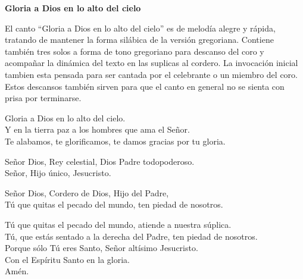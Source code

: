 \documentclass[12pt, letterpaper]{report}
\begin{document}
    {%
\parindent 0pt
\noindent
\ifx\preLilyPondExample \undefined
\else
  \expandafter\preLilyPondExample
\fi
\def\lilypondbook{}%
%
\ifx\postLilyPondExample \undefined
\else
  \expandafter\postLilyPondExample
\fi
}
    \clearpage

    {%
\parindent 0pt
\noindent
\ifx\preLilyPondExample \undefined
\else
  \expandafter\preLilyPondExample
\fi
\def\lilypondbook{}%
%
\ifx\postLilyPondExample \undefined
\else
  \expandafter\postLilyPondExample
\fi
}
    \clearpage

    {%
\parindent 0pt
\noindent
\ifx\preLilyPondExample \undefined
\else
  \expandafter\preLilyPondExample
\fi
\def\lilypondbook{}%
%
\ifx\postLilyPondExample \undefined
\else
  \expandafter\postLilyPondExample
\fi
}
    \clearpage

    \begin{center}
      \LARGE \textbf{Gloria a Dios en lo alto del cielo}
    \end{center}

    \Large El canto ``Gloria a Dios en lo alto del cielo'' es de melod\'ia alegre y r\'apida, tratando de mantener la forma sil\'abica de la versi\'on gregoriana. Contiene tambi\'en tres solos a forma de tono gregoriano para descanso del coro y acompa\~nar la din\'amica del texto en las suplicas al cordero. La invocaci\'on inicial tambien esta pensada para ser cantada por el celebrante o un miembro del coro.  Estos descansos tambi\'en sirven para que el canto en general no se sienta con prisa por terminarse.

    \noindent
    \LARGE Gloria a Dios en lo alto del cielo.\\
    Y en la tierra paz a los hombres que ama el Se\~nor. \\
    Te alabamos, te glorificamos, te damos gracias por tu gloria.

    \noindent
    Se\~nor Dios, Rey celestial, Dios Padre todopoderoso. \\
    Se\~nor, Hijo \'unico, Jesucristo.

    \noindent
    Se\~nor Dios, Cordero de Dios, Hijo del Padre, \\
    T\'u que quitas el pecado del mundo, ten piedad de nosotros.

    \noindent
    T\'u que quitas el pecado del mundo, atiende a nuestra s\'uplica. \\
    T\'u, que est\'as sentado a la derecha del Padre, ten piedad de nosotros.\\
    Porque s\'olo T\'u eres Santo, Se\~nor alt\'isimo Jesucristo. \\
    Con el Esp\'iritu Santo en la gloria.\\
    Am\'en.
    \clearpage
\end{document}
